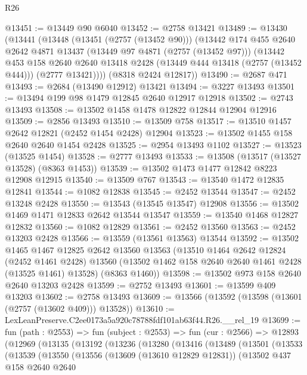 \begin{lexlean}{R26}
\begin{coremodule}
@13451 := @13449 @90 @6040
@13452 := @2758 @13421
@13489 := @13430
    (@13441
      (@13448
        (@13451 (@2757 (@13452 @90)))
        (@13442
          @174
          @455
          @2640
          @2642
          @4871
          @13437
          (@13449 @97 @4871 (@2757 (@13452 @97)))
          (@13442
            @453
            @158
            @2640
            @2640
            @13418
            @2428
            (@13449 @444 @13418 (@2757 (@13452 @444)))
            (@2777 @13421))))
      (@8318 @2424 @12817))
@13490 := @2687 @471
@13493 := @2684 (@13490 @12912) @13421
@13494 := @3227 @13493
@13501 := @13494 @199 @98 @1479 @12845 @2640 @12917 @12918
@13502 := @2743 @13493
@13508 := @13502 @1458 @1478 @12822 @12844 @12904 @12916
@13509 := @2856 @13493
@13510 := @13509 @758
@13517 := @13510 @1457 @2642 @12821 (@2452 @1454 @2428) @12904
@13523 := @13502 @1455 @158 @2640 @2640 @1454 @2428
@13525 := @2954 @13493 @1102
@13527 := @13523 (@13525 @1454)
@13528 := @2777 @13493
@13533 := @13508 (@13517 (@13527 @13528) (@8363 @1453))
@13539 := @13502 @1473 @1477 @12842 @8223 @12908 @12915
@13540 := @13509 @767
@13543 := @13540 @1472 @12835 @12841
@13544 := @1082 @12838
@13545 := @2452 @13544
@13547 := @2452 @13248 @2428
@13550 := @13543 (@13545 @13547) @12908
@13556 := @13502 @1469 @1471 @12833 @2642 @13544 @13547
@13559 := @13540 @1468 @12827 @12832
@13560 := @1082 @12829
@13561 := @2452 @13560
@13563 := @2452 @13203 @2428
@13566 := @13559 (@13561 @13563) @13544
@13592 := @13502
    @1465
    @1467
    @12825
    @2642
    @13560
    @13563
    (@13510
      @1464
      @2642
      @12824
      (@2452 @1461 @2428)
      @13560
      (@13502 @1462 @158 @2640 @2640 @1461 @2428 (@13525 @1461) @13528)
      (@8363 @1460))
@13598 := @13502 @973 @158 @2640 @2640 @13203 @2428
@13599 := @2752 @13493
@13601 := @13599 @409 @13203
@13602 := @2758 @13493
@13609 := @13566 (@13592 (@13598 (@13601 (@2757 (@13602 @409))) @13528))
@13610 := LexLeanPreserve.C2ee0173a5a920c78788fdf101ab63f44.R26.__rel_19
@13699 := fun (path : @2553) =>
  fun (subject : @2553) =>
  fun (cur : @2566) =>
  @12893
    (@12969
      (@13135
        (@13192
          (@13236
            (@13280
              (@13416
                (@13489
                  (@13501
                    (@13533
                      (@13539
                        (@13550
                          (@13556
                            (@13609 (@13610 @12829 @12831))
                            (@13502
                              @437
                              @158
                              @2640
                              @2640

\end{coremodule}
\end{lexlean}
